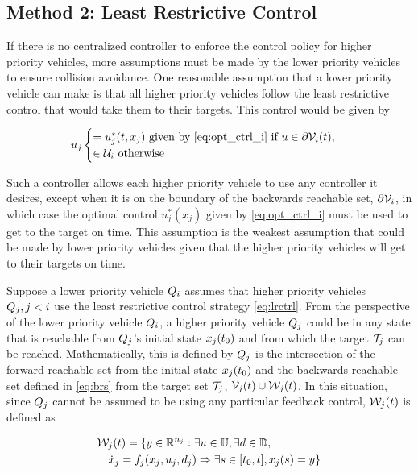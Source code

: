 \subsection{Method 2: Least Restrictive Control}
If there is no centralized controller to enforce the control policy for higher priority vehicles, more assumptions must be made by the lower priority vehicles to ensure collision avoidance. One reasonable assumption that a lower priority vehicle can make is that all higher priority vehicles follow the least restrictive control that would take them to their targets. This control would be given by 

\begin{equation}
\label{eq:lrctrl} %
u_j \begin{cases} = u_j^*(t, x_j) \text{ given by } \eqref{eq:opt_ctrl_i} \text{ if } u\in \partial \brs_i(t), \\
 \in \cset_i  \text{ otherwise}
\end{cases}
\end{equation}

Such a controller allows each higher priority vehicle to use any controller it desires, except when it is on the boundary of the backwards reachable set, $\partial \mathcal{V}_i$, in which case the optimal control $u_j^*(x_j)$ given by \eqref{eq:opt_ctrl_i} must be used to get to the target on time. This assumption is the weakest assumption that could be made by lower priority vehicles given that the higher priority vehicles will get to their targets on time.

Suppose a lower priority vehicle $Q_i$ assumes that higher priority vehicles $Q_j, j < i$ use the least restrictive control strategy \eqref{eq:lrctrl}. From the perspective of the lower priority vehicle $Q_i$, a higher priority vehicle $Q_j$ could be in any state that is reachable from $Q_j$'s initial state $x_j(t_0)$ and from which the target $\mathcal{T}_j$ can be reached. Mathematically, this is defined by $Q_j$ is the intersection of the forward reachable set from the initial state $x_j(t_0)$ and the backwards reachable set defined in \eqref{eq:brs} from the target set $\mathcal{T}_j$, $\mathcal{V}_j(t) \cup \mathcal{W}_j(t)$. In this situation, since $Q_j$ cannot be assumed to be using any particular feedback control, $\mathcal{W}_j(t)$ is defined as

\begin{equation}
\label{eq:frs2}
\begin{aligned}
&\mathcal{W}_j(t) = \{y \in \mathbb{R}^{n_j}: \exists u \in \mathbb{U}, \exists d \in \mathbb{D}, \\
& \quad \dot{x}_j = f_j(x_j, u_j, d_j) \Rightarrow \exists s \in [t_0, t], x_j(s) = y\}
\end{aligned}
\end{equation}

